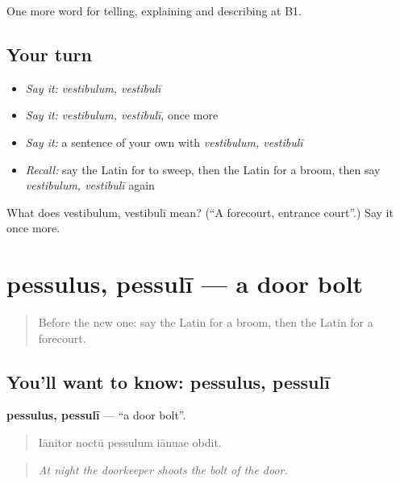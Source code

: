 \begin{grammarlens}[title={What you've built}]
One more word for telling, explaining and describing at B1.
\end{grammarlens}

\subsection*{Your turn}
\begin{itemize}
\raggedright
  \item \emph{Say it:} \emph{vestibulum, vestibulī}
  \item \emph{Say it:} \emph{vestibulum, vestibulī}, once more
  \item \emph{Say it:} a sentence of your own with \emph{vestibulum, vestibulī}
  \item \emph{Recall:} say the Latin for to sweep, then the Latin for a broom, then say \emph{vestibulum, vestibulī} again
\end{itemize}

\begin{tcolorbox}[breakable,colback=teal!4,colframe=teal!35!black,title={Before you move on}]
What does vestibulum, vestibulī mean? (\textquotedblleft{}A forecourt, entrance court\textquotedblright{}.) Say it once more.
\end{tcolorbox}
\section[pessulus, pessulī]{pessulus, pessulī — a door bolt}

\label{lesson:LA-C553-pessulus}



\begin{quote}
Before the new one: say the Latin for a broom, then the Latin for a forecourt.
\end{quote}

\subsection*{You'll want to know: pessulus, pessulī}
\textbf{pessulus, pessulī} — \textquotedblleft{}a door bolt\textquotedblright{}.

\begin{quote}
Iānitor noctū pessulum iānuae obdit.
\end{quote}

\begin{quote}
\emph{At night the doorkeeper shoots the bolt of the door.}
\end{quote}

